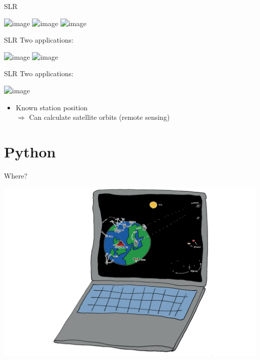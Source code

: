 \documentclass[12pt,table,t]{beamer}
\begin{document}
\begin{frame}[c]{SLR}
  \begin{center}
    \includegraphics<1>[width=\textwidth]{figure/slr_concept_01}
    \includegraphics<2>[width=\textwidth]{figure/slr_concept_02}
    \includegraphics<3>[width=\textwidth]{figure/slr_concept_03}
  \end{center}
\end{frame}


\begin{frame}[c]{SLR}
  Two applications:

  \begin{center}
    \includegraphics<1>[width=\textwidth]{figure/lageos_01}
    \includegraphics<2>[width=\textwidth]{figure/lageos_02}
  \end{center}

\end{frame}


\begin{frame}[c]{SLR}
  Two applications:

    \begin{center}
    \includegraphics<1>[width=0.7\textwidth]{figure/altimetry_06}
  \end{center}

  \begin{itemize}
  \item Known station position\\
    $\Rightarrow$ Can calculate satellite orbits (remote sensing)
  \end{itemize}
\end{frame}


\part{Python}


\begin{frame}[c]{Where?}
  \begin{center}
    \includegraphics[width=\textwidth]{figure/where}
  \end{center}
\end{frame}
\end{document}
